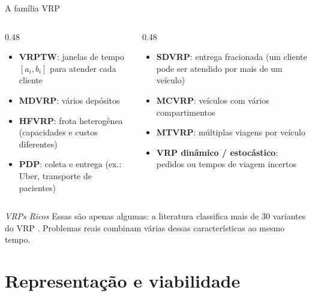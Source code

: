 \documentclass[aspectratio=169,xcolor=table]{beamer}
\begin{document}
\begin{frame}{A família VRP}
  \small
  \begin{columns}[T]
    \begin{column}{0.48\textwidth}
      \begin{itemize}
        \item \textbf{VRPTW}: janelas de tempo $[a_i, b_i]$ para atender cada cliente \cite{solomon1987algorithms}
        \item \textbf{MDVRP}: vários depósitos \cite{tillman1969multiple}
        \item \textbf{HFVRP}: frota heterogênea (capacidades e custos diferentes) \cite{golden1984fleet}
        \item \textbf{PDP}: coleta e entrega (ex.: Uber, transporte de pacientes) \cite{savelsbergh1995general}
      \end{itemize}
    \end{column}
    \begin{column}{0.48\textwidth}
      \begin{itemize}
        \item \textbf{SDVRP}: entrega fracionada (um cliente pode ser atendido por mais de um veículo) \cite{dror1989savings}
        \item \textbf{MCVRP}: veículos com vários compartimentos \cite{brown1981realtime}
        \item \textbf{MTVRP}: múltiplas viagens por veículo \cite{fleischmann1990vehicle}
        \item \textbf{VRP dinâmico / estocástico}: pedidos ou tempos de viagem incertos \cite{psaraftis1988dynamic,tillman1969multiple}
      \end{itemize}
    \end{column}
  \end{columns}
  \vspace{1em}
  \begin{block}{\emph{VRPs Ricos}}
    Essas são apenas algumas: a literatura classifica mais de 30 variantes do VRP \cite{aghaabdollahian2026overview}.
    Problemas reais combinam várias dessas características ao mesmo tempo.
  \end{block}
\end{frame}

\section{Representação e viabilidade}
\end{document}

